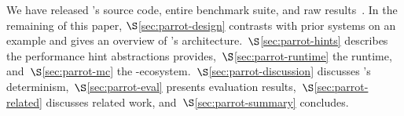 We have released \parrot's source code, entire benchmark suite, and
raw results~\cite{Parrot:github}. In the remaining of this paper,
$\S$\ref{sec:parrot-design} contrasts \parrot with 
prior systems on an example and gives an overview of \parrot's 
architecture.~$\S$\ref{sec:parrot-hints} describes the performance hint
abstractions \parrot
provides,~$\S$\ref{sec:parrot-runtime} the \parrot runtime,
and~$\S$\ref{sec:parrot-mc} the
\parrot-\dbug ecosystem.~$\S$\ref{sec:parrot-discussion} discusses \parrot's
determinism,~$\S$\ref{sec:parrot-eval}
presents evaluation results,~$\S$\ref{sec:parrot-related}
discusses related work, and~$\S$\ref{sec:parrot-summary} concludes.
